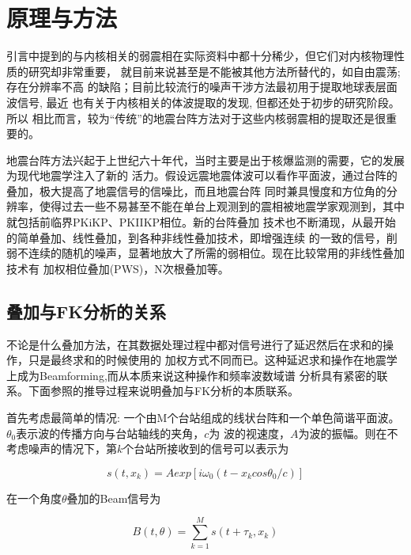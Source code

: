 \chapter{原理与方法}

引言中提到的与内核相关的弱震相在实际资料中都十分稀少，但它们对内核物理性质的研究却非常重要，
就目前来说甚至是不能被其他方法所替代的，如自由震荡\citep{DZIEWONSKI1971};存在分辨率不高
的缺陷；目前比较流行的噪声干涉方法最初用于提取地球表层面波信号\citep{Snieder2004}, 最近
也有关于内核相关的体波提取的发现\citep{Lin2013,Lin2013b}, 但都还处于初步的研究阶段。所以
相比而言，较为“传统”的地震台阵方法对于这些内核弱震相的提取还是很重要的。

地震台阵方法兴起于上世纪六十年代，当时主要是出于核爆监测的需要，它的发展为现代地震学注入了新的
活力。假设远震地震体波可以看作平面波，通过台阵的叠加，极大提高了地震信号的信噪比，而且地震台阵
同时兼具慢度和方位角的分辨率，使得过去一些不易甚至不能在单台上观测到的震相被地震学家观测到，其中
就包括前临界PKiKP\citep{Schlittenhardt1996}、PKIIKP\citep{Niu2008}相位。新的台阵叠加
技术也不断涌现\citep{Rost2002}，从最开始的简单叠加、线性叠加，到各种非线性叠加技术，即增强连续
的一致的信号，削弱不连续的随机的噪声，显著地放大了所需的弱相位。现在比较常用的非线性叠加技术有
加权相位叠加(PWS)\citep{Schimmel1997}，N次根叠加\citep{Muirhead1976}等。

\section{叠加与FK分析的关系}

不论是什么叠加方法，在其数据处理过程中都对信号进行了延迟然后在求和的操作，只是最终求和的时候使用的
加权方式不同而已。这种延迟求和操作在地震学上成为Beamforming,而从本质来说这种操作和频率波数域谱
分析具有紧密的联系。下面参照\citep{hinich1981}的推导过程来说明叠加与FK分析的本质联系。

首先考虑最简单的情况: 一个由M个台站组成的线状台阵和一个单色简谐平面波。$\theta_{0}$表示波的传播方向与台站轴线的夹角，$c$为
波的视速度，$A$为波的振幅。则在不考虑噪声的情况下，第$k$个台站所接收到的信号可以表示为

\begin{equation}
s(t,x_k) = A exp[i \omega_{0} (t-x_k cos\theta_{0}/c)]
\end{equation}

在一个角度$\theta$叠加的Beam信号为

\begin{equation}
B(t,\theta) = \sum_{k=1}^{M} s(t+\tau_{k},x_k)
\end{equation}

